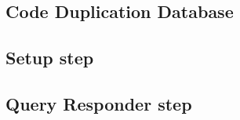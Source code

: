 \subsection{Code Duplication Database}

\subsection{Setup step}

\subsection{Query Responder step}

